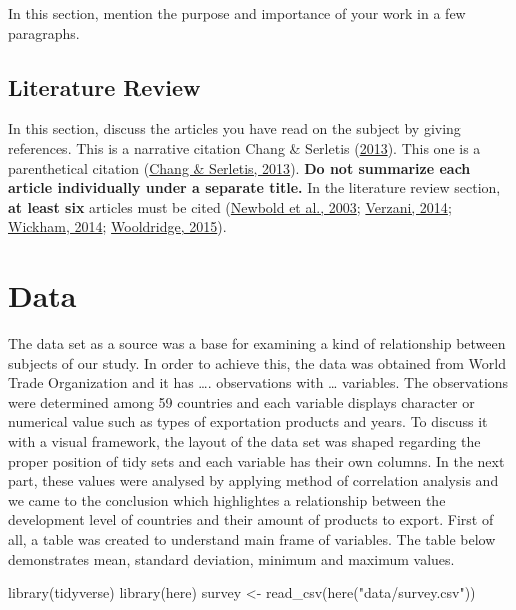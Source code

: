 \documentclass[
  12pt,
]{article}
\newenvironment{Shaded}{\begin{snugshade}}{\end{snugshade}}
\newcommand{\FunctionTok}[1]{\textcolor[rgb]{0.00,0.00,0.00}{#1}}
\newcommand{\NormalTok}[1]{#1}
\newcommand{\OtherTok}[1]{\textcolor[rgb]{0.56,0.35,0.01}{#1}}
\newcommand{\StringTok}[1]{\textcolor[rgb]{0.31,0.60,0.02}{#1}}
\begin{document}
In this section, mention the purpose and importance of your work in a few paragraphs.

\hypertarget{literature-review}{%
\subsection{Literature Review}\label{literature-review}}

In this section, discuss the articles you have read on the subject by giving references. This is a narrative citation Chang \& Serletis (\protect\hyperlink{ref-chang:2013}{2013}). This one is a parenthetical citation (\protect\hyperlink{ref-chang:2013}{Chang \& Serletis, 2013}). \textbf{Do not summarize each article individually under a separate title.} In the literature review section, \textbf{at least six} articles must be cited (\protect\hyperlink{ref-newbold:2003}{Newbold et al., 2003}; \protect\hyperlink{ref-verzani:2014}{Verzani, 2014}; \protect\hyperlink{ref-wickham:2014}{Wickham, 2014}; \protect\hyperlink{ref-wooldridge:2015a}{Wooldridge, 2015}).

\hypertarget{data}{%
\section{Data}\label{data}}

The data set as a source was a base for examining a kind of relationship between subjects of our study. In order to achieve this, the data was obtained from World Trade Organization and it has \ldots. observations with \ldots{} variables. The observations were determined among 59 countries and each variable displays character or numerical value such as types of exportation products and years. To discuss it with a visual framework, the layout of the data set was shaped regarding the proper position of tidy sets and each variable has their own columns. In the next part, these values were analysed by applying method of correlation analysis and we came to the conclusion which highlightes a relationship between the development level of countries and their amount of products to export. First of all, a table was created to understand main frame of variables. The table below demonstrates mean, standard deviation, minimum and maximum values.

\begin{Shaded}
\begin{Highlighting}[]
\FunctionTok{library}\NormalTok{(tidyverse)}
\FunctionTok{library}\NormalTok{(here)}
\NormalTok{survey }\OtherTok{\textless{}{-}} \FunctionTok{read\_csv}\NormalTok{(}\FunctionTok{here}\NormalTok{(}\StringTok{"data/survey.csv"}\NormalTok{))}
\end{Highlighting}
\end{Shaded}
\end{document}

